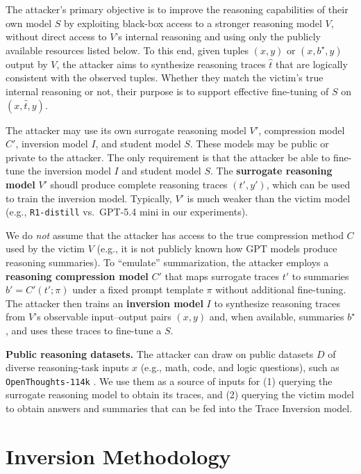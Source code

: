 \documentclass{article}
\newcommand\shortsection[1]{\vspace{.75ex}{\noindent\bf #1.}}
\begin{document}
\shortsection{Attacker’s goal}
The attacker’s primary objective is to improve the reasoning capabilities of their own model \(S\) by exploiting black-box access to a stronger reasoning model \(V\), without direct access to \(V\)’s internal reasoning and using only the publicly available resources listed below. To this end, given tuples \((x, y)\) or \((x, b^{\star}, y)\) output by $V$, the attacker aims to synthesize reasoning traces \(\hat{t}\) that are logically consistent with the observed tuples.  Whether they match the victim’s true internal reasoning or not, their purpose is to support effective fine-tuning of \(S\) on \((x, \hat{t}, y)\).

\shortsection{Attacker's auxiliary models}
The attacker may use its own surrogate reasoning model \(V'\), compression model \(C'\), inversion model \(I\), and student model \(S\).  These models may be public or private to the attacker.  The only requirement is that the attacker be able to fine-tune the inversion model \(I\) and student model \(S\).   The \textbf{surrogate reasoning model} \(V'\) shoudl produce complete reasoning traces \((t', y')\), which can be used to train the inversion model.  Typically, \(V'\) is much weaker than the victim model (e.g., \texttt{R1-distill} vs.\ GPT-5.4 mini in our experiments).

We do \emph{not} assume that the attacker has access to the true compression method $C$ used by the victim $V$ (e.g., it is not publicly known how GPT models produce reasoning summaries).  To ``emulate'' summarization, the attacker employs a \textbf{reasoning compression model} \(C'\) that maps surrogate traces \(t'\) to summaries \(b' = C'(t'; \pi)\) under a fixed prompt template \(\pi\) without additional fine-tuning.  The attacker then trains an \textbf{inversion model} \(I\) to synthesize reasoning traces from $V$’s observable input–output pairs \((x, y)\) and, when available, summaries \(b^{\star}\), and uses these traces to fine-tune a \(S\).

\noindent
\textbf{Public reasoning datasets.}  
The attacker can draw on public datasets \(D\) of diverse reasoning-task inputs \(x\) (e.g., math, code, and logic questions), such as \texttt{OpenThoughts-114k} \citep{guha2025openthoughtsdatarecipesreasoning}.  
We use them as a source of inputs for (1) querying the surrogate reasoning model to obtain its traces, and (2) querying the victim model to obtain answers and summaries that can be fed into the Trace Inversion model.


\section{Inversion Methodology}
\label{sec:method}
\end{document}
